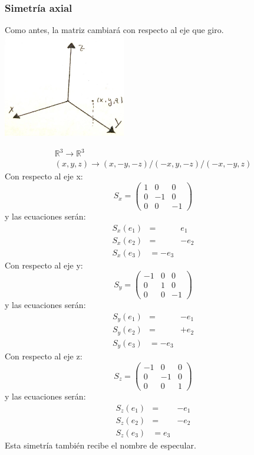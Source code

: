 \documentclass [a4paper,12pt]{article}
\begin{document}
\subsubsection{Simetría axial}
Como antes, la matriz cambiará con respecto al eje que giro.
\includegraphics[width=0.4\textwidth]
{imag3}\par\vspace{1cm}
\begin{equation}
\begin{split}
\mathbb{R}^3\rightarrow\mathbb{R}^3 \\
(x,y,z)\rightarrow(x,-y,-z)/(-x,y,-z)/(-x,-y,z)
\end{split}
\end{equation}
Con respecto al eje x:
$$
S_x=\begin{pmatrix}
1&0 &0\\
0&-1&0\\
0&0&-1
\end{pmatrix}
$$
y las ecuaciones serán: 
\begin{eqnarray}
S_x(e_1)& = & e_1 \\
S_x (e_2)& = & -e_2\\
S_x (e_3)&= - e_3
\end{eqnarray}
Con respecto al eje y:
$$
S_y=\begin{pmatrix}
-1&0 &0\\
0&1&0\\
0&0&-1
\end{pmatrix}
$$
y las ecuaciones serán: 
\begin{eqnarray}
S_y(e_1)& = & -e_1 \\
S_y (e_2)& = & +e_2\\
S_y (e_3)&= - e_3
\end{eqnarray}
Con respecto al eje z:
$$
S_z=\begin{pmatrix}
-1&0 &0\\
0&-1&0\\
0&0&1
\end{pmatrix}
$$
y las ecuaciones serán: 
\begin{eqnarray}
S_z(e_1)& = & -e_1 \\
S_z (e_2)& = & -e_2\\
S_z (e_3)&= e_3
\end{eqnarray}
Esta simetría también recibe el nombre de especular.
\end{document}
